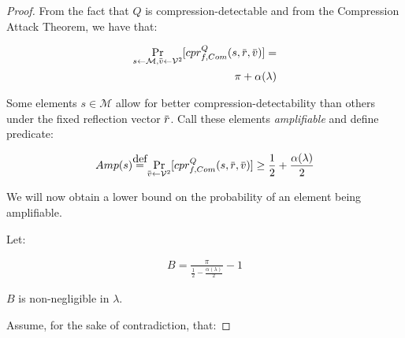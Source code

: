 \documentclass{sig-alternate-05-2015}
\newcommand\defeq{\stackrel{\mathclap{\normalfont\mbox{def}}}{=}}
\newcommand{\overbar}[1]{\mkern 1.5mu\overline{\mkern-1.5mu#1\mkern-1.5mu}\mkern 1.5mu}
\begin{document}
\begin{proof}

From the fact that $Q$ is compression-detectable and from the Compression Attack Theorem, we have that:

\begin{align*}
    \Pr_{s \leftarrow \mathcal{M},
         \overbar{v} \leftarrow \mathcal{V}^2}
         [cpr^Q_{f, Com}(s, \overbar{r}, \overbar{v})]
    =\\
    \pi + \alpha(\lambda)
\end{align*}

Some elements $s \in \mathcal{M}$ allow for better compression-detectability than others under the fixed
reflection vector $\overbar{r}$. Call these elements \textit{amplifiable} and define predicate:

\begin{align*}
    Amp(s) \defeq
    \Pr_{\overbar{v} \leftarrow \mathcal{V}^2}
    [cpr^Q_{f, Com}
     (s, \overbar{r}, \overbar{v})]
    \geq
    \frac{1}{2} + \frac{\alpha(\lambda)}{2}
\end{align*}

We will now obtain a lower bound on the probability of an element being amplifiable.

Let:


\begin{align*}
    B = \frac{\pi}{\frac{1}{2} - \frac{\alpha(\lambda)}{2}} - 1
\end{align*}

$B$ is non-negligible in $\lambda$.

Assume, for the sake of contradiction, that:


\end{proof}
\end{document}
